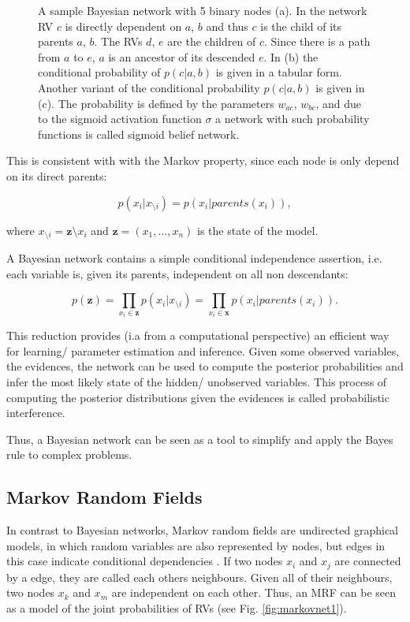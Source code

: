 \begin{figure}[h]
\begin{subfigure}[t]{.33\textwidth}
  		\caption{}
  		\label{fig:bayesnet}
	\end{subfigure}
	\caption[A sample Bayesian network with 5 binary nodes.]{A sample Bayesian network with 5 binary nodes (a). In the network RV $c$ is directly dependent on $a$, $b$ and thus $c$ is the child of its parents $a$, $b$. The RVs $d$, $e$ are the children of $c$. Since there is a path from $a$ to $e$, $a$ is an ancestor of its descended $e$. In (b) the conditional probability of $p(c |a , b)$ is given in a tabular form. Another variant of the conditional probability $p(c |a , b)$ is given in (c). The probability is defined by the parameters $w_{ac}$, $w_{bc}$, and due to the sigmoid activation function $\sigma$ a network with such probability functions is called sigmoid belief network.}
	\label{fig:test}
\end{figure}

This is consistent with with the Markov property, since each node is only depend on its direct parents:

\[
p(x_i | x_{\setminus i}) = p(x_i | parents(x_i) ),
\]

where $x_{\setminus i} = \textbf{z} \setminus x_i$ and $\textbf{z} = (x_1, ... , x_n)$ is the state of the model.


A Bayesian network contains a simple conditional independence assertion, i.e. each variable is, given its parents, independent on all non descendants:

\[
p(\textbf{z}) = \prod_{x_i \in \textbf{z}} p(x_i | x_{\setminus i}) = \prod_{x_i \in \textbf{x}} p(x_i | parents(x_i) ) .
\]

This reduction provides (i.a from a computational perspective) an efficient way for learning/ parameter estimation and inference.
Given some observed variables, the evidences, the network can be used to compute the posterior probabilities and infer the most likely state of the hidden/ unobserved variables.
This process of computing the posterior distributions given the evidences is called probabilistic interference.

Thus, a Bayesian network can be seen as a tool to simplify and apply the Bayes rule to complex problems.   

\subsection{Markov Random Fields} \label{c:markovnet}

In contrast to Bayesian networks, Markov random fields are undirected graphical models, in which random variables are also represented by nodes, but edges in this case indicate conditional dependencies \cite{Goodfellow-et-al-2016-Book}\cite{murphy2012machine}.
If two nodes $x_i$ and $x_j$ are connected by a edge, they are called each others neighbours.
Given all of their neighbours, two nodes $x_k$ and $x_m$ are independent on each other.
Thus, an MRF can be seen as a model of the joint probabilities of RVs (see Fig. \ref{fig:markovnet1}).


